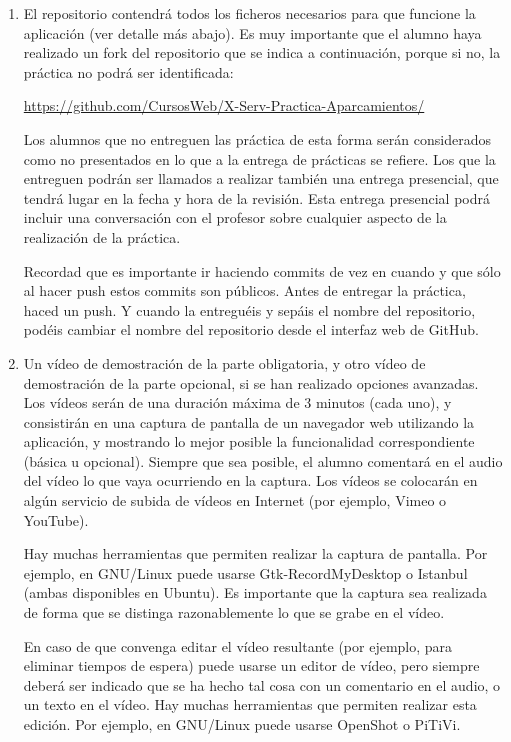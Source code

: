 \begin{enumerate}
  \item El repositorio contendrá todos los ficheros necesarios para que funcione la aplicación (ver detalle más abajo). Es muy importante que el alumno haya realizado un fork del repositorio que se indica a continuación, porque si no, la práctica no podrá ser identificada: 

\url{https://github.com/CursosWeb/X-Serv-Practica-Aparcamientos/}

Los alumnos que no entreguen las práctica de esta forma serán considerados como no presentados en lo que a la entrega de prácticas se refiere. Los que la entreguen podrán ser llamados a realizar también una entrega presencial, que tendrá lugar en la fecha y hora de la revisión. Esta entrega presencial podrá incluir una conversación con el profesor sobre cualquier aspecto de la realización de la práctica.

Recordad que es importante ir haciendo commits de vez en cuando y que sólo al hacer push estos commits son públicos. Antes de entregar la práctica, haced un push. Y cuando la entreguéis y sepáis el nombre del repositorio, podéis cambiar el nombre del repositorio desde el interfaz web de GitHub. 
 
 \item Un vídeo de demostración de la parte obligatoria, y otro vídeo de demostración de la parte opcional, si se han realizado opciones avanzadas. Los vídeos serán de una duración máxima de 3 minutos (cada uno), y consistirán en una captura de pantalla de un navegador web utilizando la aplicación, y mostrando lo mejor posible la funcionalidad correspondiente (básica u opcional). Siempre que sea posible, el alumno comentará en el audio del vídeo lo que vaya ocurriendo en la captura. Los vídeos se colocarán en algún servicio de subida de vídeos en Internet (por ejemplo, Vimeo o YouTube).

Hay muchas herramientas que permiten realizar la captura de pantalla. Por ejemplo, en GNU/Linux puede usarse Gtk-RecordMyDesktop o Istanbul (ambas disponibles en Ubuntu). Es importante que la captura sea realizada de forma que se distinga razonablemente lo que se grabe en el vídeo.

En caso de que convenga editar el vídeo resultante (por ejemplo, para eliminar tiempos de espera) puede usarse un editor de vídeo, pero siempre deberá ser indicado que se ha hecho tal cosa con un comentario en el audio, o un texto en el vídeo. Hay muchas herramientas que permiten realizar esta edición. Por ejemplo, en GNU/Linux puede usarse OpenShot o PiTiVi.


\end{enumerate}
